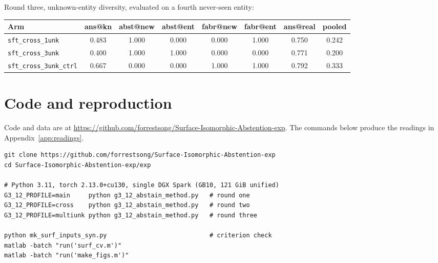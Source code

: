 \documentclass[11pt,a4paper]{article}
\begin{document}
Round three, unknown-entity diversity, evaluated on a fourth never-seen entity:

\begin{center}\small
\begin{adjustbox}{max width=\linewidth}
\begin{tabular}{@{}lccccccc@{}}
\toprule
Arm & ans@kn & abst@new & abst@ent & fabr@new & fabr@ent & ans@real & pooled \\
\midrule
\texttt{sft\_cross\_1unk} & 0.483 & 1.000 & 0.000 & 0.000 & 1.000 & 0.750 & 0.242 \\
\texttt{sft\_cross\_3unk} & 0.400 & 1.000 & 1.000 & 0.000 & 0.000 & 0.771 & 0.200 \\
\texttt{sft\_cross\_3unk\_ctrl} & 0.667 & 0.000 & 0.000 & 1.000 & 1.000 & 0.792 & 0.333 \\
\bottomrule
\end{tabular}
\end{adjustbox}
\end{center}

\section{Code and reproduction}
\label{app:repro}

Code and data are at
\url{https://github.com/forrestsong/Surface-Isomorphic-Abstention-exp}.
The commands below produce the readings in Appendix~\ref{app:readings}.

\begin{verbatim}
git clone https://github.com/forrestsong/Surface-Isomorphic-Abstention-exp
cd Surface-Isomorphic-Abstention-exp/exp

# Python 3.11, torch 2.13.0+cu130, single DGX Spark (GB10, 121 GiB unified)
G3_12_PROFILE=main     python g3_12_abstain_method.py   # round one
G3_12_PROFILE=cross    python g3_12_abstain_method.py   # round two
G3_12_PROFILE=multiunk python g3_12_abstain_method.py   # round three

python mk_surf_inputs_syn.py                            # criterion check
matlab -batch "run('surf_cv.m')"
matlab -batch "run('make_figs.m')"
\end{verbatim}
\end{document}

